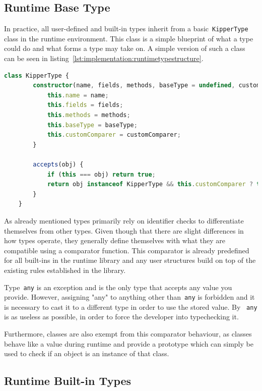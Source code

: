 \subsection{Runtime Base Type}
\label{subsec:basetype}

In practice, all user-defined and built-in types inherit from a basic~\lstinline|KipperType| class in the runtime environment. This class is a simple blueprint of what a type could do and what forms a type may take on. A simple version of such a class can be seen in listing~\ref{lst:implementation:runtimetypestructure}.

\begin{lstlisting}[language=TypeScript,caption=The structure of a runtime type,label=lst:implementation:runtimetypestructure]
	class KipperType {
		constructor(name, fields, methods, baseType = undefined, customComparer = undefined) {
			this.name = name;
			this.fields = fields;
			this.methods = methods;
			this.baseType = baseType;
			this.customComparer = customComparer;
		}

		accepts(obj) {
			if (this === obj) return true;
			return obj instanceof KipperType && this.customComparer ? this.customComparer(this, obj) : false;
		}
	}
\end{lstlisting}

As already mentioned types primarily rely on identifier checks to differentiate themselves from other types. Given though that there are slight differences in how types operate, they generally define themselves with what they are compatible using a comparator function. This comparator is already predefined for all built-ins in the runtime library and any user structures build on top of the existing rules established in the library.

Type~\lstinline|any| is an exception and is the only type that accepts any value you provide. However, assigning "any" to anything other than~\lstinline|any| is forbidden and it is necessary to cast it to a different type in order to use the stored value. By ~\lstinline|any| is as useless as possible, in order to force the developer into typechecking it.

Furthermore, classes are also exempt from this comparator behaviour, as classes behave like a value during runtime and provide a prototype which can simply be used to check if an object is an instance of that class.

\subsection{Runtime Built-in Types}
\label{subsec:builtintypes}

